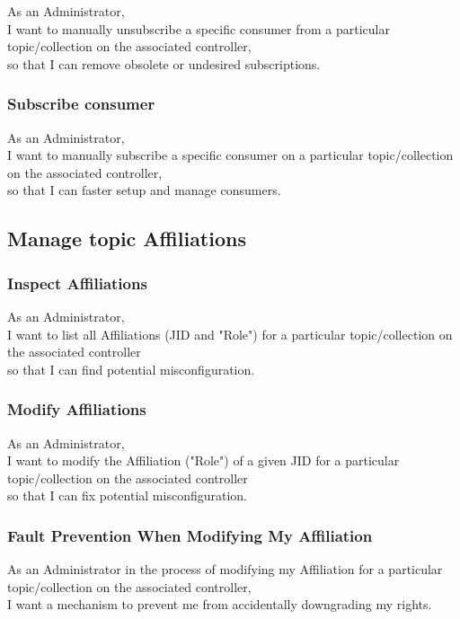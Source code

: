As an Administrator, \\
I want to manually unsubscribe a specific consumer from a particular topic/collection on the associated controller, \\
so that I can remove obsolete or undesired subscriptions.

\subsubsection{Subscribe consumer}

As an Administrator, \\
I want to manually subscribe a specific consumer on a particular topic/collection on the associated controller, \\
so that I can faster setup and manage consumers.

\subsection{Manage topic Affiliations}\label{sec:manage-affiliations}
\subsubsection{Inspect Affiliations}

As an Administrator,\\
I want to list all Affiliations (JID and "Role") for a particular topic/collection on the associated controller \\
so that I can find potential misconfiguration.

\subsubsection{Modify Affiliations}

As an Administrator,\\
I want to modify the Affiliation ("Role") of a given JID for a particular topic/collection on the associated controller \\
so that I can fix potential misconfiguration.

\subsubsection{Fault Prevention When Modifying My Affiliation}

As an Administrator in the process of modifying my Affiliation for a particular topic/collection on the associated controller,\\
I want a mechanism to prevent me from accidentally downgrading my rights.

